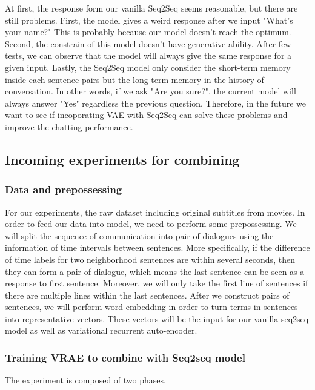 At first, the response form our vanilla Seq2Seq seems reasonable, but there are still problems. First, the model gives a weird response after we input "What's your name?" This is probably because our model doesn't reach the optimum. Second, the constrain of this model doesn't have generative ability. After few tests, we can observe that the model will always give the same response for a given input. Lastly, the Seq2Seq model only consider the short-term memory inside each sentence pairs but the long-term memory in the history of conversation. In other words, if we ask "Are you sure?", the current model will always answer "Yes" regardless the previous question. Therefore, in the future we want to see if incoporating VAE with Seq2Seq can solve these problems and improve the chatting performance.

\subsection{Incoming experiments for combining}
\subsubsection{Data and prepossessing}
For our experiments, the raw dataset including original subtitles from movies. In order to feed our data into model, we need to perform some prepossessing. We will split the sequence of communication into pair of dialogues using the information of time intervals between sentences. More specifically, if the difference of time labels for two neighborhood sentences are within several seconds, then they can form a pair of dialogue, which means the last sentence can be seen as a response to first sentence. Moreover, we will only take the first line of sentences if there are multiple lines within the last sentences. After we construct pairs of sentences, we will perform word embedding in order to turn terms in sentences into representative vectors. These vectors will be the input for our vanilla seq2seq model as well as variational recurrent auto-encoder.

\subsubsection{Training VRAE to combine with Seq2seq model}
The experiment is composed of two phases.

